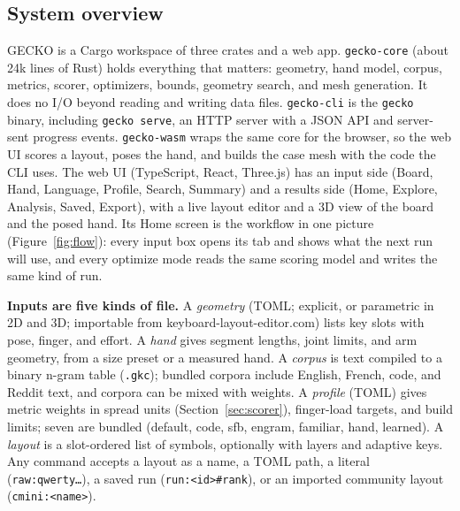 \documentclass{gecko-paper}
\begin{document}
\begin{paperbody}
\section{System overview}\label{sec:overview}
GECKO is a Cargo workspace of three crates and a web app. \texttt{gecko-core} (about 24k lines of Rust) holds everything that matters: geometry, hand model, corpus, metrics, scorer, optimizers, bounds, geometry search, and mesh generation. It does no I/O beyond reading and writing data files. \texttt{gecko-cli} is the \texttt{gecko} binary, including \texttt{gecko serve}, an HTTP server with a JSON API and server-sent progress events. \texttt{gecko-wasm} wraps the same core for the browser, so the web UI scores a layout, poses the hand, and builds the case mesh with the code the CLI uses. The web UI (TypeScript, React, Three.js) has an input side (Board, Hand, Language, Profile, Search, Summary) and a results side (Home, Explore, Analysis, Saved, Export), with a live layout editor and a 3D view of the board and the posed hand. Its Home screen is the workflow in one picture (Figure~\ref{fig:flow}): every input box opens its tab and shows what the next run will use, and every optimize mode reads the same scoring model and writes the same kind of run.



\textbf{Inputs are five kinds of file.} A \emph{geometry} (TOML; explicit, or parametric in 2D and 3D; importable from keyboard-layout-editor.com) lists key slots with pose, finger, and effort. A \emph{hand} gives segment lengths, joint limits, and arm geometry, from a size preset or a measured hand. A \emph{corpus} is text compiled to a binary n-gram table (\texttt{.gkc}); bundled corpora include English, French, code, and Reddit text, and corpora can be mixed with weights. A \emph{profile} (TOML) gives metric weights in spread units (Section~\ref{sec:scorer}), finger-load targets, and build limits; seven are bundled (default, code, sfb, engram, familiar, hand, learned). A \emph{layout} is a slot-ordered list of symbols, optionally with layers and adaptive keys. Any command accepts a layout as a name, a TOML path, a literal (\texttt{raw:qwerty\dots}), a saved run (\texttt{run:<id>\#rank}), or an imported community layout (\texttt{cmini:<name>}).


\end{paperbody}
\end{document}
